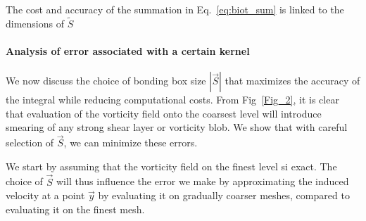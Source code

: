 \documentclass{article}
\begin{document}
The cost and accuracy of the summation in Eq.~\ref{eq:biot_sum} is linked to the dimensions of $\tilde{S}$

\paragraph{Analysis of error associated with a certain kernel}

We now discuss the choice of bonding box size $|\vec{S}|$ that maximizes the accuracy of the integral while reducing computational costs. From Fig~\ref{Fig_2}, it is clear that evaluation of the vorticity field onto the coarsest level will introduce smearing of any strong shear layer or vorticity blob. We show that with careful selection of $\vec{S}$, we can minimize these errors.

We start by assuming that the vorticity field on the finest level si exact. The choice of $\vec{S}$ will thus influence the error we make by approximating the induced velocity at a point $\vec y$ by evaluating it on gradually coarser meshes, compared to evaluating it on the finest mesh.
\end{document}
